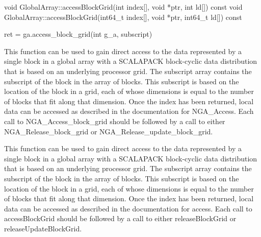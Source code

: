\documentclass[12pt]{article}
\begin{document}
\begin{cxxapi}
\begin{cxxcode}
void GlobalArray::accessBlockGrid(int index[], void *ptr, int ld[]) const
void GlobalArray::accessBlockGrid(int64_t index[], void *ptr, int64_t ld[])
                                  const
\end{cxxcode}
\begin{funcargs}
\end{funcargs}
\end{cxxapi}

\begin{pyapi}
\begin{pycode}
ret = ga.access_block_grid(int g_a, subscript)
\end{pycode}
\begin{funcargs}
\end{funcargs}
\end{pyapi}

\local

\begin{cdesc}
This function can be used to gain direct access to the data represented by a
single block in a global array with a SCALAPACK block-cyclic data distribution
that is based on an underlying processor grid. The subscript array contains the
subscript of the block in the array of blocks. This subscript is based on the
location of the block in a grid, each of whose dimensions is equal to the
number of blocks that fit along that dimension. Once the index has been
returned, local data can be accessed as described in the documentation for
NGA_Access. Each call to NGA_Access_block_grid should be followed by a call to
either NGA_Release_block_grid or NGA_Release_update_block_grid.
\end{cdesc}

\begin{cxxdesc}
This function can be used to gain direct access to the data represented by a
single block in a global array with a SCALAPACK block-cyclic data distribution
that is based on an underlying processor grid. The subscript array contains the
subscript of the block in the array of blocks. This subscript is based on the
location of the block in a grid, each of whose dimensions is equal to the
number of blocks that fit along that dimension. Once the index has been
returned, local data can be accessed as described in the documentation for
access. Each call to accessBlockGrid should be followed by a call to
either releaseBlockGrid or releaseUpdateBlockGrid.
\end{cxxdesc}
\end{document}
